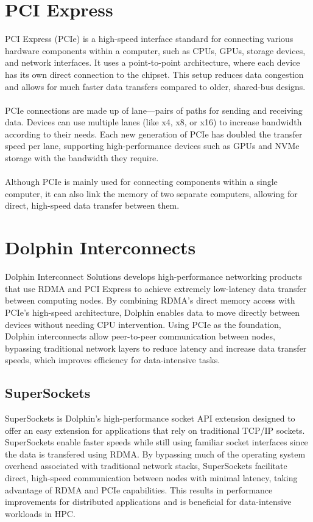 \section{PCI Express}
PCI Express (PCIe) is a high-speed interface standard for connecting various hardware components within a computer, such as CPUs, GPUs, storage devices, and network interfaces. It uses a point-to-point architecture, where each device has its own direct connection to the chipset. This setup reduces data congestion and allows for much faster data transfers compared to older, shared-bus designs.
\\\\
PCIe connections are made up of lane—pairs of paths for sending and receiving data. Devices can use multiple lanes (like x4, x8, or x16) to increase bandwidth according to their needs. Each new generation of PCIe has doubled the transfer speed per lane, supporting high-performance devices such as GPUs and NVMe storage with the bandwidth they require.
\\\\
Although PCIe is mainly used for connecting components within a single computer, it can also link the memory of two separate computers, allowing for direct, high-speed data transfer between them.


\section{Dolphin Interconnects}
Dolphin Interconnect Solutions develops high-performance networking products that use RDMA and PCI Express to achieve extremely low-latency data transfer between computing nodes. By combining RDMA’s direct memory access with PCIe’s high-speed architecture, Dolphin enables data to move directly between devices without needing CPU intervention. Using PCIe as the foundation, Dolphin interconnects allow peer-to-peer communication between nodes, bypassing traditional network layers to reduce latency and increase data transfer speeds, which improves efficiency for data-intensive tasks.

\subsection{SuperSockets}
SuperSockets is Dolphin’s high-performance socket API extension designed to offer an easy extension for applications that rely on traditional TCP/IP sockets. SuperSockets enable faster speeds while still using familiar socket interfaces since the data is transfered using RDMA. By bypassing much of the operating system overhead associated with traditional network stacks, SuperSockets facilitate direct, high-speed communication between nodes with minimal latency, taking advantage of RDMA and PCIe capabilities. This results in  performance improvements for distributed applications and is  beneficial for data-intensive workloads in HPC.

